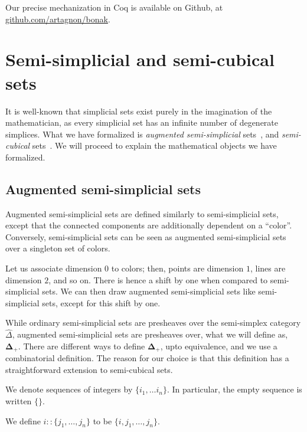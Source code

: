 \documentclass[10pt]{art.cls/art}
\newcommand{\DeltaPlus}{\ensuremath{\boldsymbol{\Delta}_+}}
\begin{document}
Our precise mechanization in Coq is available on Github, at \href{https://github.com/artagnon/bonak}{github.com/artagnon/bonak}.

\section{Semi-simplicial and semi-cubical sets}
It is well-known that simplicial sets exist purely in the imagination of the mathematician, as every simplicial set has an infinite number of degenerate simplices. What we have formalized is \emph{augmented semi-simplicial} sets~\cite{fri08}, and \emph{semi-cubical} sets~\cite{grandis03,buchholtz17}. We will proceed to explain the mathematical objects we have formalized.

\subsection{Augmented semi-simplicial sets}
Augmented semi-simplicial sets are defined similarly to semi-simplicial sets, except that the connected components are additionally dependent on a ``color''. Conversely, semi-simplicial sets can be seen as augmented semi-simplicial sets over a singleton set of colors.

Let us associate dimension $0$ to colors; then, points are dimension $1$, lines are dimension $2$, and so on. There is hence a shift by one when compared to semi-simplicial sets. We can then draw augmented semi-simplicial sets like semi-simplicial sets, except for this shift by one.

While ordinary semi-simplicial sets are presheaves over the semi-simplex category $\hat{\Delta}$, augmented semi-simplicial sets are presheaves over, what we will define as, $\DeltaPlus$. There are different ways to define $\DeltaPlus$, upto equivalence, and we use a combinatorial definition. The reason for our choice is that this definition has a straightforward extension to semi-cubical sets.

\begin{notation}
  We denote sequences of integers by $\{i_1, \ldots i_n\}$. In particular, the empty sequence is written $\{\}$.
\end{notation}

\begin{notation}[::]
  We define $i :: \{j_1, \ldots, j_n\}$ to be $\{i, j_1, \ldots, j_n\}$.
\end{notation}
\end{document}
